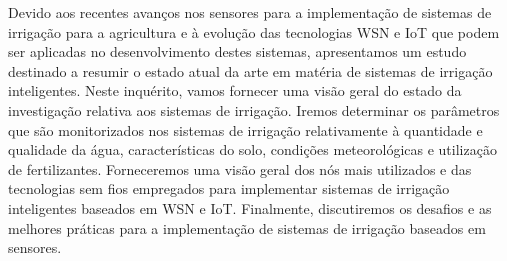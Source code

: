 \documentclass[conference]{IEEEtran}
\begin{document}
Devido aos recentes avanços nos sensores para a implementação de sistemas de 
irrigação para a agricultura e à evolução das tecnologias WSN e IoT que podem ser 
aplicadas no desenvolvimento destes sistemas, apresentamos um estudo destinado a resumir 
o estado atual da arte em matéria de sistemas de irrigação inteligentes. Neste inquérito, 
vamos fornecer uma visão geral do estado da investigação relativa aos sistemas de irrigação. 
Iremos determinar os parâmetros que são monitorizados nos sistemas de irrigação 
relativamente à quantidade e qualidade da água, características do solo, condições 
meteorológicas e utilização de fertilizantes. Forneceremos uma visão geral dos nós mais 
utilizados e das tecnologias sem fios empregados para implementar sistemas de irrigação 
inteligentes baseados em WSN e IoT. Finalmente, discutiremos os desafios e as melhores 
práticas para a implementação de sistemas de irrigação baseados em sensores.
\end{document}
